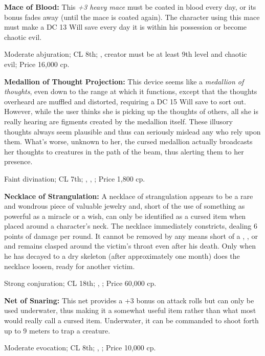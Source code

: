 \textbf{Mace of Blood:} This \emph{+3 heavy mace} must be coated in blood every day, or its bonus fades away (until the mace is coated again). The character using this mace must make a DC 13 Will save every day it is within his possession or become chaotic evil.

Moderate abjuration; CL 8th; , creator must be at least 9th level and chaotic evil; Price 16,000 cp.

\textbf{Medallion of Thought Projection:} This device seems like a \emph{medallion of thoughts}, even down to the range at which it functions, except that the thoughts overheard are muffled and distorted, requiring a DC 15 Will save to sort out. However, while the user thinks she is picking up the thoughts of others, all she is really hearing are figments created by the medallion itself. These illusory thoughts always seem plausible and thus can seriously mislead any who rely upon them. What's worse, unknown to her, the cursed medallion actually broadcasts her thoughts to creatures in the path of the beam, thus alerting them to her presence.

Faint divination; CL 7th; , , ; Price 1,800 cp.

\textbf{Necklace of Strangulation:} A necklace of strangulation appears to be a rare and wondrous piece of valuable jewelry and, short of the use of something as powerful as a miracle or a wish, can only be identified as a cursed item when placed around a character's neck. The necklace immediately constricts, dealing 6 points of damage per round. It cannot be removed by any means short of a , , or  and remains clasped around the victim's throat even after his death. Only when he has decayed to a dry skeleton (after approximately one month) does the necklace loosen, ready for another victim.

Strong conjuration; CL 18th; , ; Price 60,000 cp.

\textbf{Net of Snaring:} This net provides a +3 bonus on attack rolls but can only be used underwater, thus making it a somewhat useful item rather than what most would really call a cursed item. Underwater, it can be commanded to shoot forth up to 9 meters to trap a creature.

Moderate evocation; CL 8th; , ; Price 10,000 cp.

